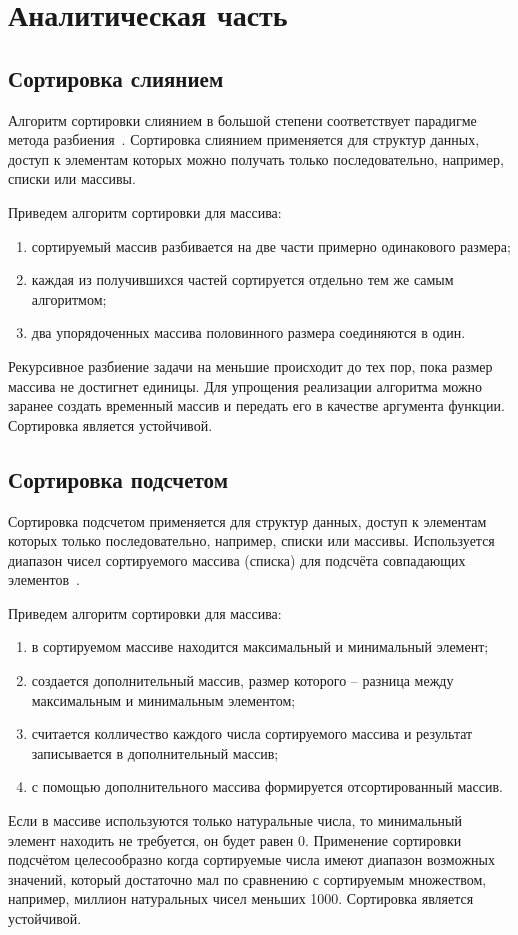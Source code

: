 \chapter{Аналитическая часть}

\section{Сортировка слиянием}

Алгоритм сортировки слиянием в большой степени соответствует парадигме метода разбиения~\cite{cormen}.
Сортировка слиянием применяется для структур данных, доступ к элементам которых можно получать только последовательно, например, списки или массивы.

Приведем алгоритм сортировки для массива:
\begin{enumerate}
	\item сортируемый массив разбивается на две части примерно одинакового размера;
	\item каждая из получившихся частей сортируется отдельно тем же самым алгоритмом; 
	\item два упорядоченных массива половинного размера соединяются в один.
\end{enumerate}
Рекурсивное разбиение задачи на меньшие происходит до тех пор, пока размер массива не достигнет единицы. Для упрощения реализации алгоритма можно заранее создать временный массив и передать его в качестве аргумента функции. Сортировка является устойчивой.

\section{Сортировка подсчетом}

Сортировка подсчетом применяется для структур данных, доступ к элементам которых только последовательно, например, списки или массивы. Используется диапазон чисел сортируемого массива (списка) для подсчёта совпадающих элементов~\cite{knut}. 

Приведем алгоритм сортировки для массива:
\begin{enumerate}
	\item в сортируемом массиве находится максимальный и минимальный элемент;
	\item создается дополнительный массив, размер которого -- разница между максимальным и минимальным элементом;
	\item считается колличество каждого числа сортируемого массива и результат записывается в дополнительный массив;
	\item с помощью дополнительного массива формируется отсортированный массив.
\end{enumerate}
Если в массиве используются только натуральные числа, то минимальный элемент находить не требуется, он будет равен 0. Применение сортировки подсчётом целесообразно когда сортируемые числа имеют диапазон возможных значений, который достаточно мал по сравнению с сортируемым множеством, например, миллион натуральных чисел меньших 1000. Сортировка является устойчивой.


